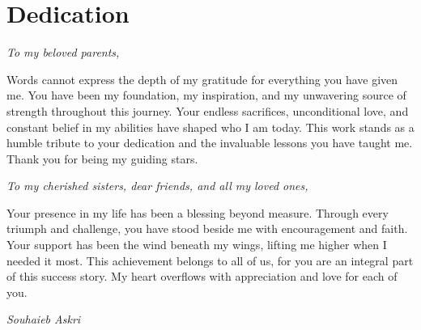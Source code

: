 \documentclass[a4paper,12pt]{report}
\begin{document}

\dominitoc
\chapter*{Dedication}

\vspace{2cm}

{\selectfont %
\large

\textit{To my beloved parents,}

Words cannot express the depth of my gratitude for everything you have given me. You have been my foundation, my inspiration, and my unwavering source of strength throughout this journey. Your endless sacrifices, unconditional love, and constant belief in my abilities have shaped who I am today. This work stands as a humble tribute to your dedication and the invaluable lessons you have taught me. Thank you for being my guiding stars.

\vspace{1cm}

\textit{To my cherished sisters, dear friends, and all my loved ones,}

Your presence in my life has been a blessing beyond measure. Through every triumph and challenge, you have stood beside me with encouragement and faith. Your support has been the wind beneath my wings, lifting me higher when I needed it most. This achievement belongs to all of us, for you are an integral part of this success story. My heart overflows with appreciation and love for each of you.

}

\vspace{3cm}
\begin{flushright}
{\selectfont\Large\textit{Souhaieb Askri}}
\end{flushright}

\newpage

\vspace{2cm}
\end{document}
